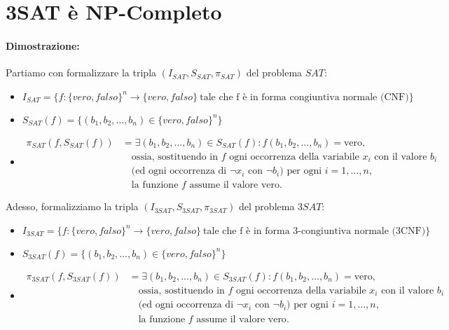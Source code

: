 \section{3SAT è NP-Completo}

\paragraph*{Dimostrazione: }

Partiamo con formalizzare la tripla $(I_{SAT}, S_{SAT}, \pi_{SAT})$ del problema $SAT$:
\begin{itemize}
    \item [] {
        $
            I_{SAT} = \{f: \{vero, falso\}^n \rightarrow \{vero, falso\}\ \text{tale che f è in forma congiuntiva normale (CNF)}\}    
        $
    }
    \item [] {
        $
            S_{SAT}(f) = \{(b_{1}, b_{2}, \dots, b_{n}) \in \{vero, falso\}^n\}    
        $
    }
    \item []{
        \begin{align*}
            \pi_{SAT}(f, S_{SAT}(f)) &= \exists (b_{1}, b_{2}, \dots, b_{n}) \in S_{SAT}(f): f(b_{1}, b_{2}, \dots, b_{n}) = \text{vero}, \\
            &\quad \text{ossia, sostituendo in } f \text{ ogni occorrenza della variabile } x_{i} \text{ con il valore } b_{i} \\
            &\quad \text{(ed ogni occorrenza di } \lnot x_{i} \text{ con } \lnot b_{i}) \text{ per ogni } i = 1, \dots, n, \\
            &\quad \text{la funzione } f \text{ assume il valore vero}.
        \end{align*}  
    }
\end{itemize}

Adesso, formalizziamo la tripla $(I_{3SAT}, S_{3SAT}, \pi_{3SAT})$ del problema $3SAT$:
\begin{itemize}
    \item [] {
        $
            I_{3SAT} = \{f: \{vero, falso\}^n \rightarrow \{vero, falso\}\ \text{tale che f è in forma 3-congiuntiva normale (3CNF)}\}    
        $
    }
    \item [] {
        $
            S_{3SAT}(f) = \{(b_{1}, b_{2}, \dots, b_{n}) \in \{vero, falso\}^n\}    
        $
    }
    \item []{
        \begin{align*}
            \pi_{3SAT}(f, S_{3SAT}(f)) &= \exists (b_{1}, b_{2}, \dots, b_{n}) \in S_{3SAT}(f): f(b_{1}, b_{2}, \dots, b_{n}) = \text{vero}, \\
            &\quad \text{ossia, sostituendo in } f \text{ ogni occorrenza della variabile } x_{i} \text{ con il valore } b_{i} \\
            &\quad \text{(ed ogni occorrenza di } \lnot x_{i} \text{ con } \lnot b_{i}) \text{ per ogni } i = 1, \dots, n, \\
            &\quad \text{la funzione } f \text{ assume il valore vero}.
        \end{align*}  
    }
\end{itemize}


